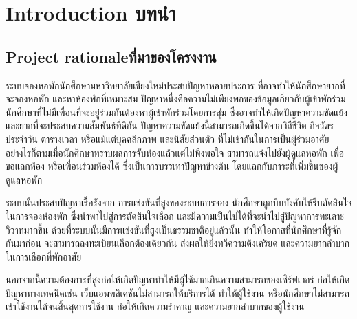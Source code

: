 \chapter{\ifenglish Introduction \else บทนำ\fi}
\section{\ifenglish Project rationale\else ที่มาของโครงงาน\fi}


ระบบจองหอพักนักศึกษามหาวิทยาลัยเชียงใหม่ประสบปัญหาหลายประการ ที่อาจทำให้นักศึกษายากที่จะจองหอพัก 
และหาห้องพักที่เหมาะสม ปัญหาหนึ่งคือความไม่เพียงพอของข้อมูลเกี่ยวกับผู้เข้าพักร่วม 
นักศึกษาที่ไม่มีเพื่อนที่จะอยู่ร่วมกันต้องหาผู้เข้าพักร่วมโดยการสุ่ม ซึ่งอาจทำให้เกิดปัญหาความขัดแย้ง 
และยากที่จะประสบความสัมพันธ์ที่ดีกัน ปัญหาความขัดแย้งนี้สามารถเกิดขึ้นได้จากวิถีชีวิต กิจวัตรประจำวัน 
ตารางเวลา หรือแม้แต่บุคคลิกภาพ และนิสัยส่วนตัว ที่ไม่เข้ากันในการเป็นผู้ร่วมอาศัย
อย่างไรก็ตามเมื่อนักศึกษาทราบผลการจับห้องแล้วแต่ไม่พึงพอใจ สามารถแจ้งไปยังผู้ดูแลหอพัก เพื่อขอแลกห้อง หรือเพื่อนร่วมห้องได้
ซึ่งเป็นการบรรเทาปัญหาข้างต้น โดยแลกกับภาระที่เพิ่มขึ้นของผู้ดูแลหอพัก

ระบบนั้นประสบปัญหาเรื้อรังจาก การแข่งขันที่สูงของระบบการจอง นักศึกษาถูกบีบบังคับให้รีบตัดสินใจในการจองห้องพัก
ซึ่งนำพาไปสู่การตัดสินใจเลือก และมีความเป็นไปได้ที่จะนำไปสู่ปัญหาการทะเลาะวิวาทมากขึ้น ด้วยที่ระบบนั้นมีการแข่งขันที่สูงเป็นธรรมชาติอยู่แล้วนั้น
ทำให้โอกาสที่นักศึกษาที่รู้จักกันมาก่อน จะสามารถลงทะเบียนเลือกต้องเดียวกัน ส่งผลให้ยิ่งทวีความตึงเครียด
และความยากลำบากในการเลือกที่พักอาศัย

นอกจากนี้ความต้องการที่สูงก่อให้เกิดปัญหาทำให้มีผู้ใช้มากเกินความสามารถของเซิร์ฟเวอร์ ก่อให้เกิดปัญหาทางเทคนิคเช่น 
เว็บแอพพลิเคชันไม่สามารถให้บริการได้ ทำให้ผู้ใช้งาน หรือนักศึกษาไม่สามารถเข้าใช้งานได้จนสิ้นสุดการใช้งาน 
ก่อให้เกิดความรำคาญ และความยากลำบากของผู้ใช้งาน

